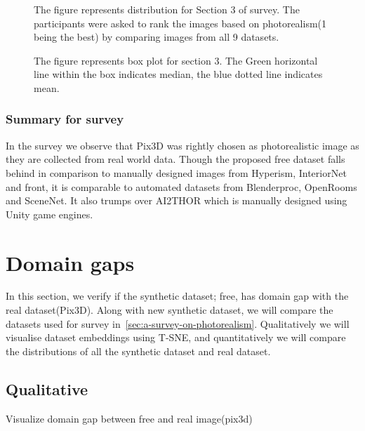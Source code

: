 \begin{figure}
    \centering
    \resizebox{\textwidth}{!}{}
    \caption{The figure represents distribution for Section 3 of survey. The participants were asked to rank the images based on photorealism(1 being the best) by comparing images from all 9 datasets.}
    \label{fig:question3}
\end{figure}

\begin{figure}
    \centering
    \resizebox{0.75\textwidth}{!}{}
    \caption{The figure represents box plot for section 3. The Green horizontal line within the box indicates median, the blue dotted line indicates mean.}
    \label{fig:question3_2}
\end{figure}

\subsubsection{Summary for survey}
In the survey we observe that Pix3D was rightly chosen as photorealistic image as they are collected from real world data.
Though the proposed \gls{free} dataset falls behind in comparison to manually designed images from Hyperism, InteriorNet and \gls{front},
it is comparable to automated datasets from Blenderproc, OpenRooms and SceneNet.
It also trumps over AI2THOR which is manually designed using Unity game engines.

\section{Domain gaps}\label{sec:domain-gaps}

In this section, we verify if the synthetic dataset;
\gls{free}, has domain gap with the real dataset(Pix3D).
Along with new synthetic dataset, we will compare the datasets used for survey in~\ref{sec:a-survey-on-photorealism}.
Qualitatively we will visualise dataset embeddings using T-SNE, and quantitatively we will compare the distributions of all the synthetic dataset and real dataset.

\subsection{Qualitative}\label{subsec:qualitative}Visualize domain gap between \gls{free} and real image(pix3d)

